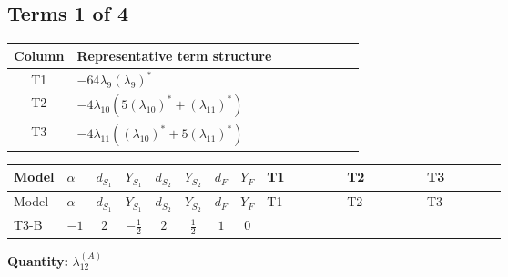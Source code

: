 \documentclass[8pt]{article}
\begin{document}
\begin{landscape}
\subsection*{Terms 1 of 4}
\begin{center}
\begin{tabular}{@{}c >{\raggedright\arraybackslash}p{0.82\linewidth}@{}}
\toprule
Column & Representative term structure \\
\midrule
T1 & \(\displaystyle -64 {\lambda_{9}} \left({\lambda_{9}}\right)^{*}\) \\
\midrule
T2 & \(\displaystyle -4 {\lambda_{10}} (5 \left({\lambda_{10}}\right)^{*}+\left({\lambda_{11}}\right)^{*})\) \\
\midrule
T3 & \(\displaystyle -4 {\lambda_{11}} (\left({\lambda_{10}}\right)^{*}+5 \left({\lambda_{11}}\right)^{*})\) \\
\midrule
\bottomrule
\end{tabular}
\end{center}
\smallskip
\tiny
\begin{longtable}{@{}llcccccc >{\raggedright\arraybackslash}p{0.21\linewidth} >{\raggedright\arraybackslash}p{0.21\linewidth} >{\raggedright\arraybackslash}p{0.21\linewidth}@{}}
\toprule
Model & $\alpha$ & $d_{S_1}$ & $Y_{S_1}$ & $d_{S_2}$ & $Y_{S_2}$ & $d_F$ & $Y_F$ & T1 & T2 & T3 \\
\midrule
\endfirsthead
\toprule
Model & $\alpha$ & $d_{S_1}$ & $Y_{S_1}$ & $d_{S_2}$ & $Y_{S_2}$ & $d_F$ & $Y_F$ & T1 & T2 & T3 \\
\midrule
\endhead
T3-B & $-1$ & $2$ & $-\frac{1}{2}$ & $2$ & $\frac{1}{2}$ & $1$ & $0$ & \scriptsize\adjustbox{max width=\linewidth}{$\begin{gathered} -64 {\lambda_{9}} \left({\lambda_{9}}\right)^{*}\end{gathered}$} & \scriptsize\adjustbox{max width=\linewidth}{$\begin{gathered} -4 {\lambda_{10}} (5 \left({\lambda_{10}}\right)^{*}+\left({\lambda_{11}}\right)^{*})\end{gathered}$} & \scriptsize\adjustbox{max width=\linewidth}{$\begin{gathered} -4 {\lambda_{11}} (\left({\lambda_{10}}\right)^{*}+5 \left({\lambda_{11}}\right)^{*})\end{gathered}$} \\
\midrule
\bottomrule
\end{longtable}
\clearpage
\noindent\textbf{Quantity: }$\lambda_{12}^{(A)}$\par\smallskip

\end{landscape}
\end{document}
